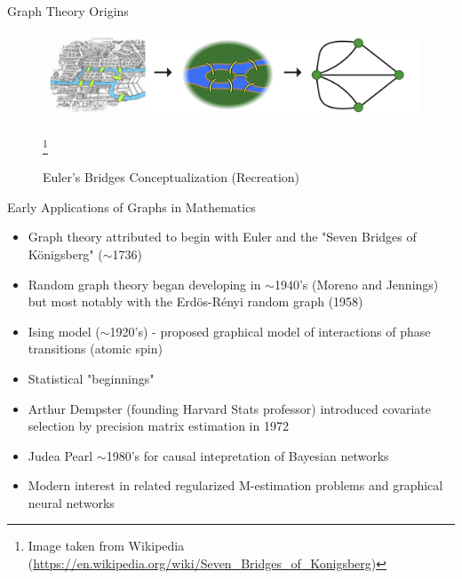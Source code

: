 \documentclass{beamer}
\begin{document}
\begin{frame}{Graph Theory Origins \cite{imperatorskaia_akademia_nauk_russia_commentarii_1726,shields_cultural_2012}}
\begin{figure}
    \centering 
    \includegraphics[scale=0.5]{Wikipedia_Bridges.png}
    \caption{Euler's Bridges Conceptualization (Recreation)}\footnote{Image taken from Wikipedia (\url{https://en.wikipedia.org/wiki/Seven_Bridges_of_Konigsberg})}
\end{figure}
\end{frame}



\begin{frame}{Early Applications of Graphs in Mathematics}
\begin{itemize}
    \item Graph theory attributed to begin with Euler and the "Seven Bridges of K\"onigsberg" ($\sim$1736)
    \item Random graph theory began developing in $\sim$1940's (Moreno and Jennings) but most notably with the Erd\"os-R\'enyi random graph (1958)
    \item Ising model ($\sim$1920's) - proposed graphical model of interactions of phase transitions (atomic spin)
    \item Statistical "beginnings"%
    \item Arthur Dempster (founding Harvard Stats professor) introduced covariate selection by precision matrix estimation in 1972 \cite{dempster_covariance_1972}
    \item Judea Pearl $\sim$1980's for causal intepretation of Bayesian networks
    \item Modern interest in related regularized M-estimation problems and graphical neural networks 
\end{itemize}
\end{frame}
\end{document}
